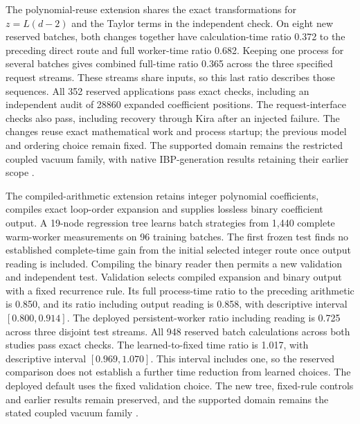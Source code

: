 \documentclass[11pt,a4paper]{article}
\begin{document}
The polynomial-reuse extension shares the exact transformations for \(z=L(d-2)\)
and the Taylor terms in the independent check. On eight new reserved
batches, both changes together have calculation-time ratio 0.372 to
the preceding direct route and full worker-time ratio 0.682.
Keeping one process for several batches gives combined full-time ratio
0.365 across the three specified request streams. These streams share
inputs, so this last ratio describes those sequences.
All 352 reserved applications pass exact checks, including an independent
audit of 28860 expanded coefficient positions. The request-interface
checks also pass, including recovery through Kira after an injected failure.
The changes reuse exact mathematical work and process startup; the
previous model and ordering choice remain fixed. The supported domain
remains the restricted coupled vacuum family, with native IBP-generation
results retaining their earlier scope \cite{KiraPolynomialReuseData}.

The compiled-arithmetic extension retains integer polynomial coefficients, compiles exact
loop-order expansion and supplies lossless binary coefficient output.
A 19-node regression tree learns batch strategies from 1,440 complete
warm-worker measurements on 96 training batches. The first frozen test
finds no established complete-time gain from the initial selected
integer route once output reading is included. Compiling the binary
reader then permits a new validation and independent test.
Validation selects compiled expansion and binary output with a fixed recurrence rule. Its full process-time ratio to the preceding
arithmetic is 0.850, and its ratio including output reading is 0.858,
with descriptive interval \([0.800,0.914]\). The deployed persistent-worker ratio
including reading is 0.725 across three disjoint test streams.
All 948 reserved batch calculations across both studies pass exact
checks. The learned-to-fixed time ratio is 1.017, with descriptive
interval \([0.969,1.070]\). This interval includes one, so the reserved comparison does not establish a further time reduction from learned choices. The deployed default uses the fixed validation choice.
The new tree, fixed-rule controls and earlier results remain preserved,
and the supported domain remains the stated coupled vacuum family
\cite{KiraExactBackendData}.
\end{document}
